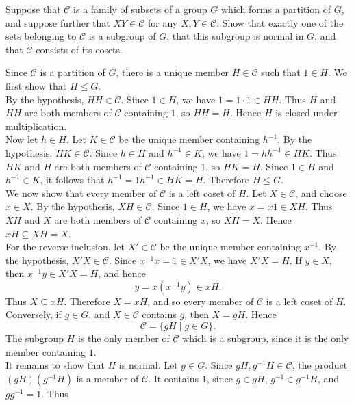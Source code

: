\documentclass[../Odyssey_Project.tex]{subfiles}
\begin{document}
\begin{exercise}
\label{ex:1.9}
Suppose that $\mathcal{C}$ is a family of subsets of a group $G$ which forms a partition of $G$, and suppose further that $XY \in \mathcal{C}$ for any $X, Y \in \mathcal{C}$. Show that exactly one of the sets belonging to $\mathcal{C}$ is a subgroup of $G$, that this subgroup is normal in $G$, and that $\mathcal{C}$ consists of its cosets.
\end{exercise}
\begin{solution}
Since \(\mathcal C\) is a partition of \(G\), there is a unique member \(H \in \mathcal C\) such that \(1 \in H\). We first show that \(H \leq G\). \\
By the hypothesis, \(HH \in \mathcal C\). Since \(1 \in H\), we have \(1 = 1 \cdot 1 \in HH\). Thus \(H\) and \(HH\) are both members of \(\mathcal C\) containing \(1\), so \(HH = H\). Hence \(H\) is closed under multiplication. \\
Now let \(h \in H\). Let \(K \in \mathcal C\) be the unique member containing \(h^{-1}\). By the hypothesis, \(HK \in \mathcal C\). Since \(h \in H\) and \(h^{-1} \in K\), we have \(1 = hh^{-1} \in HK\). Thus \(HK\) and \(H\) are both members of \(\mathcal C\) containing \(1\), so \(HK = H\). Since \(1 \in H\) and \(h^{-1} \in K\), it follows that \(h^{-1} = 1h^{-1} \in HK = H\). Therefore \(H \leq G\). \\
We now show that every member of \(\mathcal C\) is a left coset of \(H\). Let \(X \in \mathcal C\), and choose \(x \in X\). By the hypothesis, \(XH \in \mathcal C\). Since \(1 \in H\), we have \(x = x1 \in XH\). Thus \(XH\) and \(X\) are both members of \(\mathcal C\) containing \(x\), so \(XH = X\). Hence \(xH \subseteq XH = X\). \\
For the reverse inclusion, let \(X' \in \mathcal C\) be the unique member containing \(x^{-1}\). By the hypothesis, \(X'X \in \mathcal C\). Since \(x^{-1}x = 1 \in X'X\), we have \(X'X = H\). If \(y \in X\), then \(x^{-1}y \in X'X = H\), and hence
\[
    y = x(x^{-1}y) \in xH.
\]
Thus \(X \subseteq xH\). Therefore \(X = xH\), and so every member of \(\mathcal C\) is a left coset of \(H\). Conversely, if \(g \in G\), and \(X \in \mathcal C\) contains \(g\), then \(X = gH\). Hence
\[
    \mathcal C = \{gH \mid g \in G\}.
\]
The subgroup \(H\) is the only member of \(\mathcal C\) which is a subgroup, since it is the only member containing \(1\). \\
It remains to show that \(H\) is normal. Let \(g \in G\). Since \(gH,g^{-1}H \in \mathcal C\), the product \((gH)(g^{-1}H)\) is a member of \(\mathcal C\). It contains \(1\), since \(g \in gH\), \(g^{-1} \in g^{-1}H\), and \(gg^{-1}=1\). Thus

\end{solution}
\end{document}
